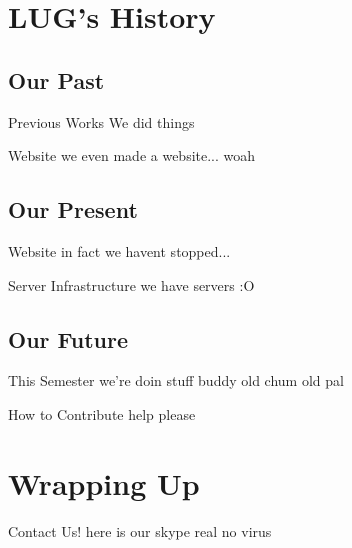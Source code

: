 \documentclass{beamer}
\begin{document}
  \section{LUG's History}
  \subsection{Our Past}
  \begin{frame}{Previous Works}
    We did things
  \end{frame}

  \begin{frame}{Website}
    we even made a website... woah
  \end{frame}

  \subsection{Our Present}
  \begin{frame}{Website}
    in fact we havent stopped...
  \end{frame}

  \begin{frame}{Server Infrastructure}
    we have servers :O
  \end{frame}

  \subsection{Our Future}
  \begin{frame}{This Semester}
    we're doin stuff buddy old chum old pal
  \end{frame}

  \begin{frame}{How to Contribute}
    help please
  \end{frame}

  \section{Wrapping Up}
  \begin{frame}{Contact Us!}
    here is our skype real no virus
  \end{frame}
\end{document}
